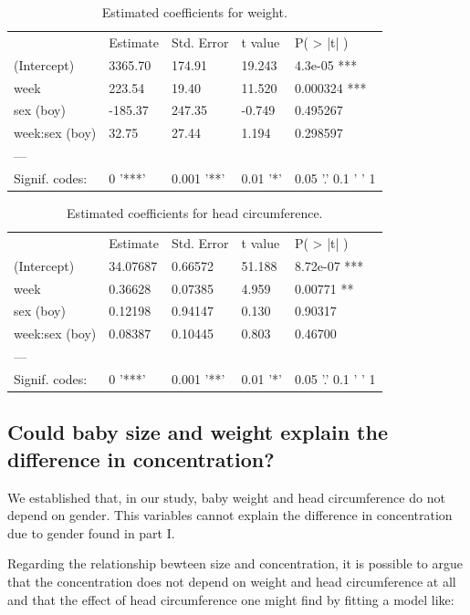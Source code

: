 \documentclass[12pt]{article}
\begin{document}
\begin{table}[!htb]
\begin{tabular}{lllll}
 & Estimate & Std. Error & t value & P\left( > |t| \right) \\
(Intercept) & 3365.70 & 174.91 & 19.243 & 4.3e-05 *** \\
week & 223.54 & 19.40 & 11.520 & 0.000324 *** \\
sex (boy) & -185.37 & 247.35 & -0.749 & 0.495267 \\
week:sex (boy) & 32.75 & 27.44 & 1.194 & 0.298597 \\
--- &  &  &  &  \\
Signif. codes: & 0 '***' & 0.001 '**' & 0.01 '*' & 0.05 '.' 0.1 ' ' 1
\end{tabular}
\caption{Estimated coefficients for weight.}
\label{tab:weight}
\end{table}

\begin{table}[!htb]
\begin{tabular}{lllll}
 & Estimate & Std. Error & t value & P\left( > |t| \right)\\
(Intercept) & 34.07687 & 0.66572 & 51.188 & 8.72e-07 *** \\
week & 0.36628 & 0.07385 & 4.959 & 0.00771 ** \\
sex (boy) & 0.12198 & 0.94147 & 0.130 & 0.90317 \\
week:sex (boy) & 0.08387 & 0.10445 & 0.803 & 0.46700 \\
--- &  &  &  &  \\
Signif. codes: & 0 '***' & 0.001 '**' & 0.01 '*' & 0.05 '.' 0.1 ' ' 1
\end{tabular}
\caption{Estimated coefficients for head circumference.}
\label{tab:head_c}
\end{table}

\clearpage

\subsection{Could baby size and weight explain the difference in concentration?}

We established that, in our study, baby weight and head circumference do not depend on gender. This variables cannot explain the difference in concentration due to gender found in part I.

Regarding the relationship bewteen size and concentration, it is possible to argue that the concentration does not depend on weight and head circumference at all and that the effect of head circumference one might find by fitting a model like:
\end{document}
